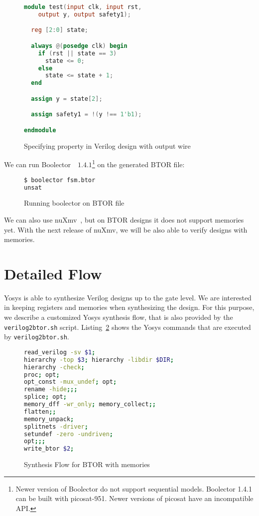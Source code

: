 \documentclass[9pt,technote,a4paper]{IEEEtran}
\begin{document}
\begin{figure}[H]
\begin{lstlisting}[language=Verilog,numbers=none]
module test(input clk, input rst,
    output y, output safety1);

  reg [2:0] state;

  always @(posedge clk) begin
    if (rst || state == 3)
      state <= 0;
    else
      state <= state + 1;
  end

  assign y = state[2];

  assign safety1 = !(y !== 1'b1);

endmodule
\end{lstlisting}
\renewcommand{\figurename}{Listing}
\caption{Specifying property in Verilog design with output wire}
\label{specifying_property_output}
\end{figure}

We can run Boolector~\cite{boolector}~$1.4.1$\footnote{
Newer version of Boolector do not support sequential models.
Boolector 1.4.1 can be built with picosat-951. Newer versions
of picosat have an incompatible API.} on the generated BTOR
file:

\begin{figure}[H]
\begin{lstlisting}[language=sh,numbers=none]
$ boolector fsm.btor
unsat
\end{lstlisting}
 \renewcommand{\figurename}{Listing}
\caption{Running boolector on BTOR file}
\end{figure}

We can also use nuXmv~\cite{nuxmv}, but on BTOR designs it does not
support memories yet. With the next release of nuXmv, we will be also
able to verify designs with memories.

\section{Detailed Flow}

Yosys is able to synthesize Verilog designs up to the gate level.
We are interested in keeping registers and memories when synthesizing
the design. For this purpose, we describe a customized Yosys synthesis
flow, that is also provided by the {\tt verilog2btor.sh} script.
Listing~\ref{btor_script_memory} shows the Yosys commands that are
executed by {\tt verilog2btor.sh}.

\begin{figure}[H]
\begin{lstlisting}[language=sh]
read_verilog -sv $1;
hierarchy -top $3; hierarchy -libdir $DIR;
hierarchy -check;
proc; opt;
opt_const -mux_undef; opt;
rename -hide;;;
splice; opt;
memory_dff -wr_only; memory_collect;;
flatten;;
memory_unpack;
splitnets -driver;
setundef -zero -undriven;
opt;;;
write_btor $2;
\end{lstlisting}
 \renewcommand{\figurename}{Listing}
\caption{Synthesis Flow for BTOR with memories}
\label{btor_script_memory}
\end{figure}
\end{document}
